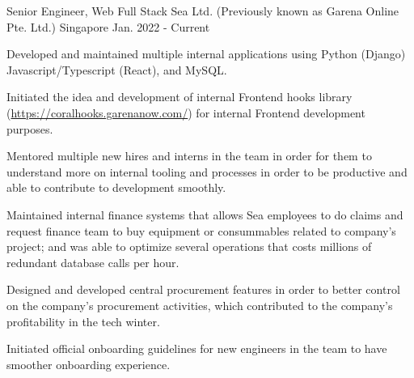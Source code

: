 

\begin{cventries}

  \cventry
    {Senior Engineer, Web Full Stack} %
    {Sea Ltd. (Previously known as Garena Online Pte. Ltd.)} %
    {Singapore} %
    {Jan. 2022 - Current} %
    {
      \begin{cvitems} %
        \item {Developed and maintained multiple internal applications using Python (Django) Javascript/Typescript (React), and MySQL.}
        \item {Initiated the idea and development of internal Frontend hooks library (\url{https://coralhooks.garenanow.com/}) for internal Frontend development purposes.}
        \item {Mentored multiple new hires and interns in the team in order for them to understand more on internal tooling and processes in order to be productive and able to contribute to development smoothly.}
        \item {Maintained internal finance systems that allows Sea employees to do claims and request finance team to buy equipment or consummables related to company's project; and was able to optimize several operations that costs millions of redundant database calls per hour.}
        \item {Designed and developed central procurement features in order to better control on the company's procurement activities, which contributed to the company's profitability in the tech winter.}
        \item {Initiated official onboarding guidelines for new engineers in the team to have smoother onboarding experience.}
      \end{cvitems}
    }


\end{cventries}
